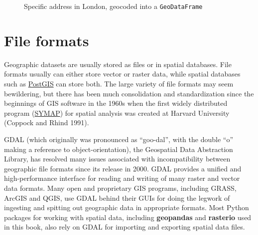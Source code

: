 \documentclass[
  letterpaper,
]{krantz}
\begin{document}
\begin{figure}


\caption{\label{fig-ox-geocode}Specific address in London, geocoded into
a \texttt{GeoDataFrame}}

\end{figure}%

\section{File formats}\label{sec-file-formats}

Geographic datasets are usually stored as files or in spatial databases.
File formats usually can either store vector or raster data, while
spatial databases such as \href{https://postgis.net/}{PostGIS} can store
both. The large variety of file formats may seem bewildering, but there
has been much consolidation and standardization since the beginnings of
GIS software in the 1960s when the first widely distributed program
(\href{https://news.harvard.edu/gazette/story/2011/10/the-invention-of-gis/}{SYMAP})
for spatial analysis was created at Harvard University (Coppock and
Rhind 1991).

GDAL (which originally was pronounced as ``goo-dal'', with the double
``o'' making a reference to object-orientation), the Geospatial Data
Abstraction Library, has resolved many issues associated with
incompatibility between geographic file formats since its release in
2000. GDAL provides a unified and high-performance interface for reading
and writing of many raster and vector data formats. Many open and
proprietary GIS programs, including GRASS, ArcGIS and QGIS, use GDAL
behind their GUIs for doing the legwork of ingesting and spitting out
geographic data in appropriate formats. Most Python packages for working
with spatial data, including \textbf{geopandas} and \textbf{rasterio}
used in this book, also rely on GDAL for importing and exporting spatial
data files.
\end{document}

